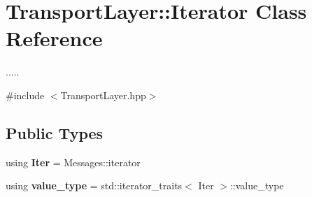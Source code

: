 \hypertarget{classTransportLayer_1_1Iterator}{}\section{Transport\+Layer\+:\+:Iterator Class Reference}
\label{classTransportLayer_1_1Iterator}


.....  




{\ttfamily \#include $<$Transport\+Layer.\+hpp$>$}

\subsection*{Public Types}
\begin{DoxyCompactItemize}
\item 
using {\bfseries Iter} = Messages\+::iterator\hypertarget{classTransportLayer_1_1Iterator_aea710b242009554ddf3ecd55da63b28d}{}\label{classTransportLayer_1_1Iterator_aea710b242009554ddf3ecd55da63b28d}

\item 
using {\bfseries value\+\_\+type} = std\+::iterator\+\_\+traits$<$ Iter $>$\+::value\+\_\+type\hypertarget{classTransportLayer_1_1Iterator_a261524174200a439d46fed51bc84fdfb}{}\label{classTransportLayer_1_1Iterator_a261524174200a439d46fed51bc84fdfb}

\end{DoxyCompactItemize}
